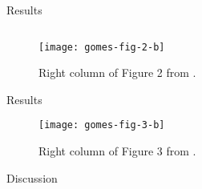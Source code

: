 \begin{frame}{Results}

\begin{figure}
\begin{columns}
\begin{column}{0.5\textwidth}
\texttt{[image: gomes-fig-2-b]}
\end{column}
\begin{column}{0.5\textwidth}
\caption{
Right column of Figure 2 from \cite{gomes2015cooperative}.
}
\end{column}
\end{columns}
\end{figure}

\end{frame}

\begin{frame}{Results}

\begin{figure}

\texttt{[image: gomes-fig-3-b]}

\caption{
Right column of Figure 3 from \cite{gomes2015cooperative}.
}

\end{figure}

\end{frame}

\begin{frame}{Discussion}

\end{frame}
